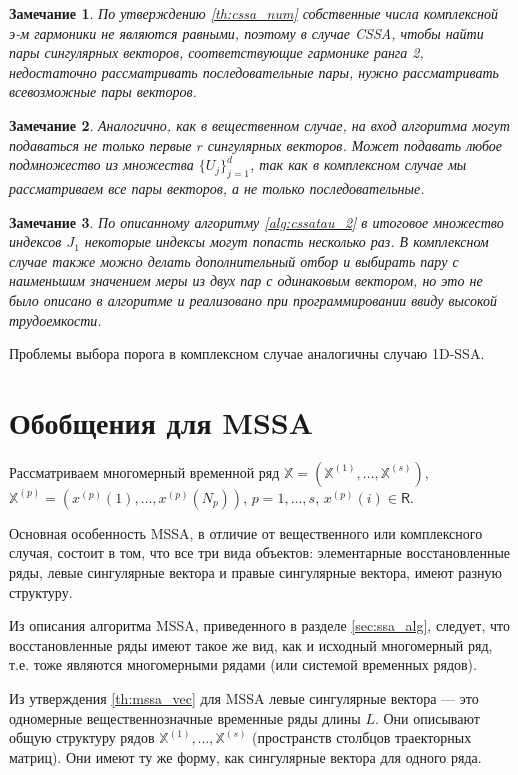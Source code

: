 \documentclass[specialist,
               substylefile = spbu.rtx,
               subf,href,colorlinks=true, 12pt]{disser}
\newtheorem{remark}{Замечание}
\begin{document}
\begin{remark}
По утверждению \ref{th:cssa_num} собственные числа комплексной э-м гармоники не являются равными, поэтому в случае CSSA, чтобы найти пары сингулярных векторов, соответствующие гармонике ранга 2, недостаточно рассматривать последовательные пары, нужно рассматривать всевозможные пары векторов.
\end{remark}

\begin{remark}
Аналогично, как в вещественном случае, на вход алгоритма могут подаваться не только первые $r$ сингулярных векторов. Может подавать любое подмножество из множества $\{U_j\}_{j=1}^{d}$, так как в комплексном случае мы рассматриваем все пары векторов, а не только последовательные.
\end{remark}

\begin{remark}
По описанному алгоритму \ref{alg:cssatau_2} в итоговое множество индексов $J_1$ некоторые индексы могут попасть несколько раз. 
В комплексном случае также можно делать дополнительный отбор и выбирать пару с наименьшим значением меры из двух пар с одинаковым вектором, но это не было описано в алгоритме и реализовано при программировании ввиду высокой трудоемкости.
\end{remark}

Проблемы выбора порога в комплексном случае аналогичны случаю 1D-SSA. 

\section{Обобщения для MSSA}

Рассматриваем многомерный временной ряд $\mathbb{X}= \left(\mathbb{X}^{(1)}, \ldots,\mathbb{X}^{(s)}\right)$,\\ $\mathbb{X}^{(p)}= \left(x^{(p)}(1),\ldots,x^{(p)}(N_p)\right)$, $p=1,\ldots,s$, $x^{(p)}(i) \in \mathsf{R}$. 

Основная особенность MSSA, в отличие от вещественного или комплексного случая, состоит в том, что все три вида объектов: элементарные восстановленные ряды, левые сингулярные вектора и правые сингулярные вектора, имеют разную структуру.

Из описания алгоритма MSSA, приведенного в разделе \ref{sec:ssa_alg}, следует, что восстановленные ряды имеют такое же вид, как и исходный многомерный ряд, т.е. тоже являются многомерными рядами (или системой временных рядов). 

Из утверждения \ref{th:mssa_vec} для MSSA левые сингулярные вектора --- это одномерные вещественнозначные временные ряды
 длины $L$. 
Они описывают общую структуру рядов $\mathbb{X}^{(1)}, \ldots, \mathbb{X}^{(s)}$ (пространств столбцов траекторных матриц). Они имеют ту же форму, как сингулярные вектора для одного ряда.
 
\end{document}
